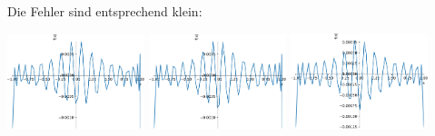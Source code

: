 \subsection{}

Die Fehler sind entsprechend klein:

\begin{center}
  \includegraphics[width = 0.3\textwidth]{chapter_09/exercise_09_49_figure_4.pdf}
  \hspace{1em}
  \includegraphics[width = 0.3\textwidth]{chapter_09/exercise_09_49_figure_5.pdf}
  \hspace{1em}
  \includegraphics[width = 0.3\textwidth]{chapter_09/exercise_09_49_figure_6.pdf}
\end{center}




